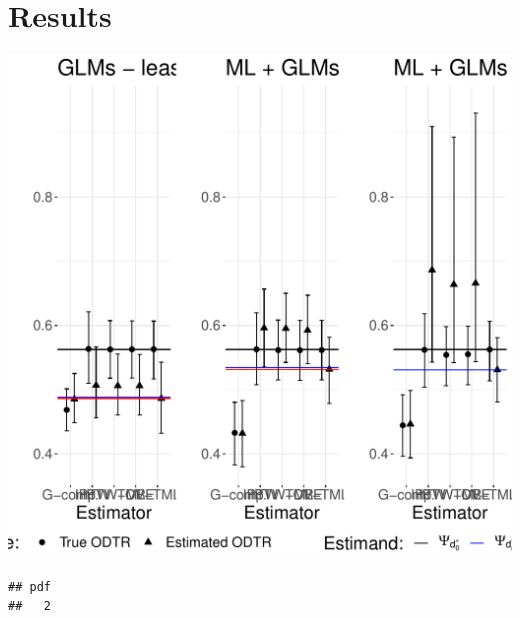 \documentclass[11pt]{article}\usepackage[]{graphicx}\usepackage[]{color}
\makeatletter
\def\maxwidth{ %
  \ifdim\Gin@nat@width>\linewidth
    \linewidth
  \else
    \Gin@nat@width
  \fi
}
\newenvironment{kframe}{%
 \def\at@end@of@kframe{}%
 \ifinner\ifhmode%
  \def\at@end@of@kframe{\end{minipage}}%
  \begin{minipage}{\columnwidth}%
 \fi\fi%
 \def\FrameCommand##1{\hskip\@totalleftmargin \hskip-\fboxsep
 \colorbox{shadecolor}{##1}\hskip-\fboxsep
     \hskip-\linewidth \hskip-\@totalleftmargin \hskip\columnwidth}%
 \MakeFramed {\advance\hsize-\width
   \@totalleftmargin\z@ \linewidth\hsize
   \@setminipage}}%
 {\par\unskip\endMakeFramed%
 \at@end@of@kframe}
\newenvironment{knitrout}{}{} %
\makeatother
\begin{document}
\section{Results}
\begin{knitrout}
\color{fgcolor}
\includegraphics[width=\maxwidth]{figure/unnamed-chunk-1-1} 
\begin{kframe}\begin{verbatim}
## pdf 
##   2
\end{verbatim}
\end{kframe}
\end{knitrout}
\end{document}
